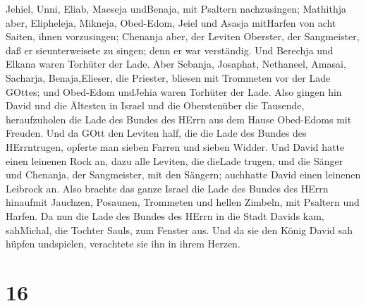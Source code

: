 Jehiel, Unni, Eliab, Maeseja undBenaja, mit Psaltern nachzusingen;
 Mathithja aber, Elipheleja, Mikneja, Obed-Edom, Jeiel und
Asasja mitHarfen von acht Saiten, ihnen vorzusingen; 
Chenanja aber, der Leviten Oberster, der Sangmeister, daß er
sieunterweisete zu singen; denn er war verständig.  Und
Berechja und Elkana waren Torhüter der Lade.  Aber Sebanja,
Josaphat, Nethaneel, Amasai, Sacharja, Benaja,Elieser, die Priester,
bliesen mit Trommeten vor der Lade GOttes; und Obed-Edom undJehia waren
Torhüter der Lade.  Also gingen hin David und die Ältesten
in Israel und die Oberstenüber die Tausende, heraufzuholen die Lade des
Bundes des HErrn aus dem Hause Obed-Edoms mit Freuden.  Und
da GOtt den Leviten half, die die Lade des Bundes des HErrntrugen,
opferte man sieben Farren und sieben Widder.  Und David
hatte einen leinenen Rock an, dazu alle Leviten, die dieLade trugen, und
die Sänger und Chenanja, der Sangmeister, mit den Sängern; auchhatte
David einen leinenen Leibrock an.  Also brachte das ganze
Israel die Lade des Bundes des HErrn hinaufmit Jauchzen, Posaunen,
Trommeten und hellen Zimbeln, mit Psaltern und Harfen.  Da
nun die Lade des Bundes des HErrn in die Stadt Davids kam, sahMichal,
die Tochter Sauls, zum Fenster aus. Und da sie den König David sah
hüpfen undspielen, verachtete sie ihn in ihrem Herzen.

\hypertarget{section-15}{%
\section{16}\label{section-15}}

